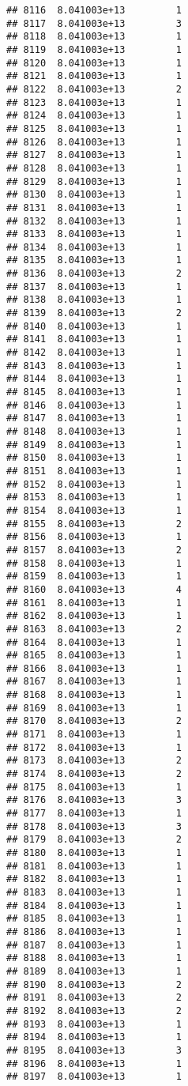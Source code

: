 \documentclass[
]{article}
\begin{document}
\begin{verbatim}
## 8116  8.041003e+13         1
## 8117  8.041003e+13         3
## 8118  8.041003e+13         1
## 8119  8.041003e+13         1
## 8120  8.041003e+13         1
## 8121  8.041003e+13         1
## 8122  8.041003e+13         2
## 8123  8.041003e+13         1
## 8124  8.041003e+13         1
## 8125  8.041003e+13         1
## 8126  8.041003e+13         1
## 8127  8.041003e+13         1
## 8128  8.041003e+13         1
## 8129  8.041003e+13         1
## 8130  8.041003e+13         1
## 8131  8.041003e+13         1
## 8132  8.041003e+13         1
## 8133  8.041003e+13         1
## 8134  8.041003e+13         1
## 8135  8.041003e+13         1
## 8136  8.041003e+13         2
## 8137  8.041003e+13         1
## 8138  8.041003e+13         1
## 8139  8.041003e+13         2
## 8140  8.041003e+13         1
## 8141  8.041003e+13         1
## 8142  8.041003e+13         1
## 8143  8.041003e+13         1
## 8144  8.041003e+13         1
## 8145  8.041003e+13         1
## 8146  8.041003e+13         1
## 8147  8.041003e+13         1
## 8148  8.041003e+13         1
## 8149  8.041003e+13         1
## 8150  8.041003e+13         1
## 8151  8.041003e+13         1
## 8152  8.041003e+13         1
## 8153  8.041003e+13         1
## 8154  8.041003e+13         1
## 8155  8.041003e+13         2
## 8156  8.041003e+13         1
## 8157  8.041003e+13         2
## 8158  8.041003e+13         1
## 8159  8.041003e+13         1
## 8160  8.041003e+13         4
## 8161  8.041003e+13         1
## 8162  8.041003e+13         1
## 8163  8.041003e+13         2
## 8164  8.041003e+13         1
## 8165  8.041003e+13         1
## 8166  8.041003e+13         1
## 8167  8.041003e+13         1
## 8168  8.041003e+13         1
## 8169  8.041003e+13         1
## 8170  8.041003e+13         2
## 8171  8.041003e+13         1
## 8172  8.041003e+13         1
## 8173  8.041003e+13         2
## 8174  8.041003e+13         2
## 8175  8.041003e+13         1
## 8176  8.041003e+13         3
## 8177  8.041003e+13         1
## 8178  8.041003e+13         3
## 8179  8.041003e+13         2
## 8180  8.041003e+13         1
## 8181  8.041003e+13         1
## 8182  8.041003e+13         1
## 8183  8.041003e+13         1
## 8184  8.041003e+13         1
## 8185  8.041003e+13         1
## 8186  8.041003e+13         1
## 8187  8.041003e+13         1
## 8188  8.041003e+13         1
## 8189  8.041003e+13         1
## 8190  8.041003e+13         2
## 8191  8.041003e+13         2
## 8192  8.041003e+13         2
## 8193  8.041003e+13         1
## 8194  8.041003e+13         1
## 8195  8.041003e+13         3
## 8196  8.041003e+13         1
## 8197  8.041003e+13         1

\end{verbatim}
\end{document}
